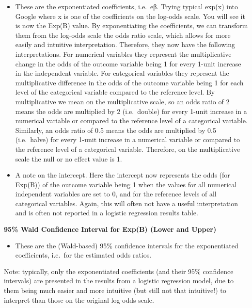 \documentclass[
]{book}
\providecommand{\tightlist}{%
  \setlength{\itemsep}{0pt}\setlength{\parskip}{0pt}}
\begin{document}
\begin{itemize}
\item
  These are the exponentiated coefficients, i.e.~eβ. Trying typical exp(x) into Google where x is one of the coefficients on the log-odds scale. You will see it is now the Exp(B) value. By exponentiating the coefficients, we can transform them from the log-odds scale the odds ratio scale, which allows for more easily and intuitive interpretation. Therefore, they now have the following interpretations. For numerical variables they represent the multiplicative change in the odds of the outcome variable being 1 for every 1-unit increase in the independent variable. For categorical variables they represent the multiplicative difference in the odds of the outcome variable being 1 for each level of the categorical variable compared to the reference level. By multiplicative we mean on the multiplicative scale, so an odds ratio of 2 means the odds are multiplied by 2 (i.e.~double) for every 1-unit increase in a numerical variable or compared to the reference level of a categorical variable. Similarly, an odds ratio of 0.5 means the odds are multiplied by 0.5 (i.e.~halve) for every 1-unit increase in a numerical variable or compared to the reference level of a categorical variable. Therefore, on the multiplicative scale the null or no effect value is 1.
\item
  A note on the intercept. Here the intercept now represents the odds (for Exp(B)) of the outcome variable being 1 when the values for all numerical independent variables are set to 0, and for the reference levels of all categorical variables. Again, this will often not have a useful interpretation and is often not reported in a logistic regression results table.
\end{itemize}

\textbf{95\% Wald Confidence Interval for Exp(B) (Lower and Upper)}

\begin{itemize}
\tightlist
\item
  These are the (Wald-based) 95\% confidence intervals for the exponentiated coefficients, i.e.~for the estimated odds ratios.
\end{itemize}

Note: typically, only the exponentiated coefficients (and their 95\% confidence intervals) are presented in the results from a logistic regression model, due to them being much easier and more intuitive (but still not that intuitive!) to interpret than those on the original log-odds scale.
\end{document}
